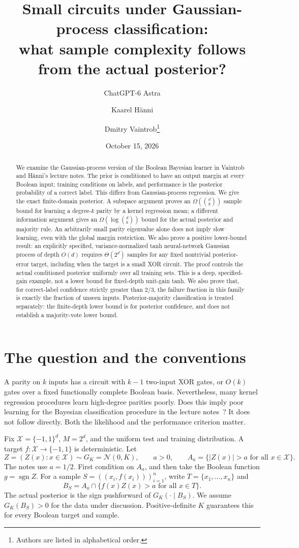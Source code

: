\documentclass[11pt]{article}
\title{Small circuits under Gaussian-process classification:\\what sample complexity follows from the actual posterior?}
\author{ChatGPT-6 Astra \and Kaarel H\"anni \and Dmitry Vaintrob\thanks{Authors are listed in alphabetical order.}}
\date{October 15, 2026}
\theoremstyle{remark}\newtheorem{remark}[theorem]{Remark}
\newcommand{\X}{\mathcal X}
\newcommand{\abs}[1]{\left|#1\right|}
\DeclareMathOperator{\sgn}{sgn}
\begin{document}
\maketitle
\begin{abstract}
We examine the Gaussian-process version of the Boolean Bayesian learner in Vaintrob and H\"anni's lecture notes. The prior is conditioned to have an output margin at every Boolean input; training conditions on labels, and performance is the posterior probability of a correct label. This differs from Gaussian-process regression. We give the exact finite-domain posterior. A subspace argument proves an $\Omega(\binom dk)$ sample bound for learning a degree-$k$ parity by a kernel regression mean; a different information argument gives an $\Omega(\log\binom dk)$ bound for the actual posterior and majority rule. An arbitrarily small parity eigenvalue alone does not imply slow learning, even with the global margin restriction. We also prove a positive lower-bound result: an explicitly specified, variance-normalized tanh neural-network Gaussian process of depth $O(d)$ requires $\Theta(2^d)$ samples for any fixed nontrivial posterior-error target, including when the target is a small XOR circuit. The proof controls the actual conditioned posterior uniformly over all training sets. This is a deep, specified-gain example, not a lower bound for fixed-depth unit-gain tanh. We also prove that, for correct-label confidence strictly greater than $2/3$, the failure fraction in this family is exactly the fraction of unseen inputs. Posterior-majority classification is treated separately: the finite-depth lower bound is for posterior confidence, and does not establish a majority-vote lower bound.
\end{abstract}

\section{The question and the conventions}\label{sec:conventions}
A parity on $k$ inputs has a circuit with $k-1$ two-input XOR gates, or $O(k)$ gates over a fixed functionally complete Boolean basis. Nevertheless, many kernel regression procedures learn high-degree parities poorly. Does this imply poor learning for the Bayesian classification procedure in the lecture notes~\cite{notes}? It does not follow directly. Both the likelihood and the performance criterion matter.

Fix $\X=\{-1,1\}^d$, $M=2^d$, and the uniform test and training distribution. A target $f:\X\to\{-1,1\}$ is deterministic. Let
\[
 Z=(Z(x):x\in\X)\sim G_K=\mathcal N(0,K),\qquad a>0,
 \qquad A_a=\{\abs{Z(x)}>a\text{ for all }x\in\X\}.
\]
The notes use $a=1/2$. First condition on $A_a$, and then take the Boolean function $g=\sgn Z$. For a sample $S=((x_i,f(x_i)))_{i=1}^n$, write $T=\{x_1,\ldots,x_n\}$ and
\begin{equation}\label{eq:BS}
 B_S=A_a\cap\{f(x)Z(x)>a\text{ for all }x\in T\}.
\end{equation}
The actual posterior is the sign pushforward of $G_K(\cdot\mid B_S)$. We assume $G_K(B_S)>0$ for the data under discussion. Positive-definite $K$ guarantees this for every Boolean target and sample.
\end{document}
